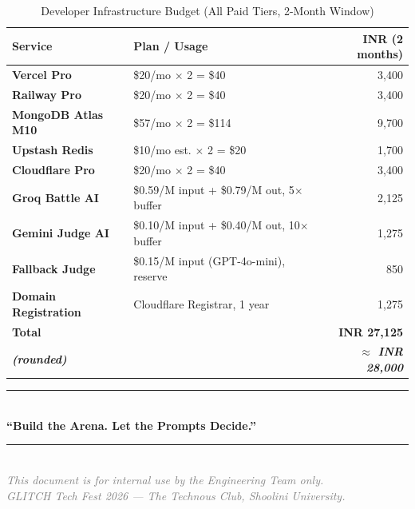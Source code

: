 \documentclass[11pt, a4paper]{article}
\begin{document}
\begin{table}[H]
\centering
\small\renewcommand{\arraystretch}{1.3}
\begin{tabularx}{\textwidth}{>{\bfseries}l X r}
\toprule
Service & Plan / Usage & INR (2 months) \\
\midrule
Vercel Pro              & \$20/mo $\times$ 2 = \$40          & 3,400 \\
Railway Pro             & \$20/mo $\times$ 2 = \$40          & 3,400 \\
MongoDB Atlas M10       & \$57/mo $\times$ 2 = \$114         & 9,700 \\
Upstash Redis           & \$10/mo est. $\times$ 2 = \$20     & 1,700 \\
Cloudflare Pro          & \$20/mo $\times$ 2 = \$40          & 3,400 \\
Groq Battle AI          & \$0.59/M input + \$0.79/M out, 5$\times$ buffer & 2,125 \\
Gemini Judge AI         & \$0.10/M input + \$0.40/M out, 10$\times$ buffer & 1,275 \\
Fallback Judge          & \$0.15/M input (GPT-4o-mini), reserve & 850 \\
Domain Registration     & Cloudflare Registrar, 1 year       & 1,275 \\
\midrule
\textbf{Total}          & & \textbf{INR 27,125} \\
\textit{(rounded)}      & & \textit{\textbf{$\approx$ INR 28,000}} \\
\bottomrule
\end{tabularx}
\caption{Developer Infrastructure Budget (All Paid Tiers, 2-Month Window)}
\end{table}

\vfill
\begin{center}
\textcolor{accentgold}{\rule{0.55\textwidth}{1.5pt}}\\[0.4cm]
{\large\bfseries\textcolor{primaryblue}{``Build the Arena. Let the Prompts Decide.''}}\\[0.3cm]
\textcolor{gray}{\rule{0.3\textwidth}{0.5pt}}\\[0.3cm]
{\small\textcolor{gray}{\textit{This document is for internal use by the Engineering Team only.}}}\\
{\small\textcolor{gray}{\textit{GLITCH Tech Fest 2026 --- The Technous Club, Shoolini University.}}}
\end{center}
\end{document}
